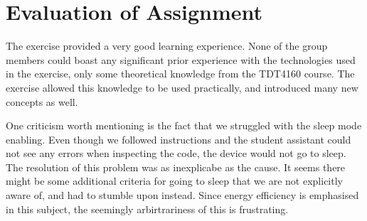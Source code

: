\chapter{Evaluation of Assignment}
The exercise provided a very good learning experience. None of the group members could boast any significant prior experience with the technologies used in the exercise, only some theoretical knowledge from the TDT4160 course. The exercise allowed this knowledge to be used practically, and introduced many new concepts as well.

One criticism worth mentioning is the fact that we struggled with the sleep mode enabling. Even though we followed instructions and the student assistant could not see any errors when inspecting the code, the device would not go to sleep. The resolution of this problem was as inexplicabe as the cause. It seems there might be some additional criteria for going to sleep that we are not explicitly aware of, and had to stumble upon instead. Since energy efficiency is emphasised in this subject, the seemingly arbirtrariness of this is frustrating.

